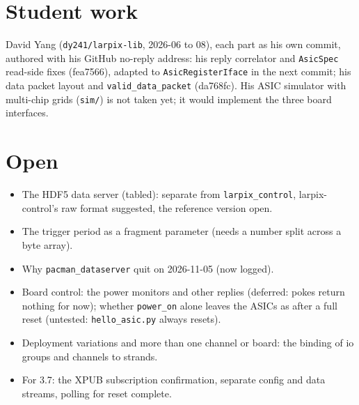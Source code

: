 \documentclass[11pt]{article}
\newcommand{\h}[1]{\texttt{#1}}
\begin{document}
\section{Student work}

David Yang (\h{dy241/larpix-lib}, 2026-06 to 08), each part as his own commit, authored with his GitHub no-reply
address:  his reply correlator and \h{AsicSpec} read-side fixes (fea7566), adapted to \h{AsicRegisterIface} in the next commit;  his data packet layout and
\h{valid\_data\_packet} (da768fc).  His ASIC simulator with multi-chip grids (\h{sim/}) is not taken yet;  it would
implement the three board interfaces.

\section{Open}

\begin{itemize}
\item The HDF5 data server (tabled):  separate from \h{larpix\_control}, larpix-control's raw format suggested,
  the reference version open.
\item The trigger period as a fragment parameter (needs a number split across a byte array).
\item Why \h{pacman\_dataserver} quit on 2026-11-05 (now logged).
\item Board control:  the power monitors and other replies (deferred:  pokes return nothing for now);  whether
  \h{power\_on} alone leaves the ASICs as after a full reset (untested:  \h{hello\_asic.py} always resets).
\item Deployment variations and more than one channel or board:  the binding of io groups and channels to strands.
\item For 3.7:  the XPUB subscription confirmation, separate config and data streams, polling for reset complete.
\end{itemize}
\end{document}
